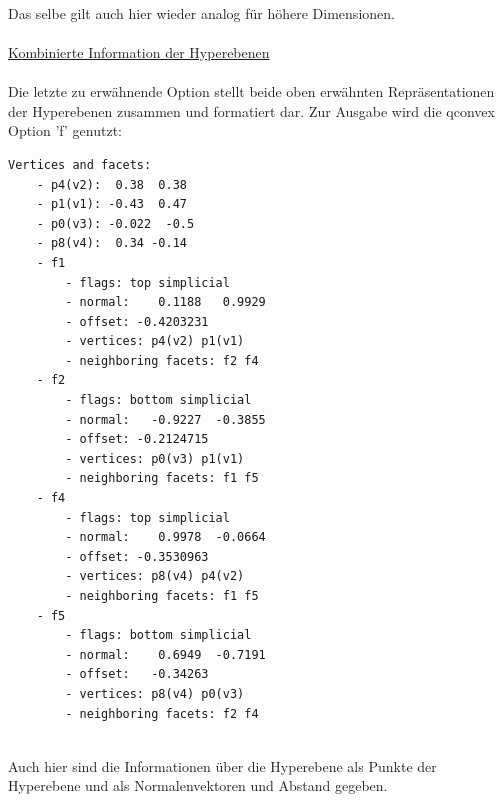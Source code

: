 \documentclass[12pt]{scrartcl}
\begin{document}
\ \\~\\~\\
Das selbe gilt auch hier wieder analog für höhere Dimensionen.\\


\ \\
\underline{Kombinierte Information der Hyperebenen}\\~\\
Die letzte zu erwähnende Option stellt beide oben erwähnten Repräsentationen der Hyperebenen zusammen und formatiert dar. Zur Ausgabe wird die qconvex Option 'f' genutzt:\\

\begin{lstlisting}[style=Terminal, caption={Ausgabe von qconvex mit Option 'f'},captionpos=b]
    Vertices and facets:
    - p4(v2):  0.38  0.38
    - p1(v1): -0.43  0.47
    - p0(v3): -0.022  -0.5
    - p8(v4):  0.34 -0.14
    - f1
        - flags: top simplicial
        - normal:    0.1188   0.9929
        - offset: -0.4203231
        - vertices: p4(v2) p1(v1)
        - neighboring facets: f2 f4
    - f2
        - flags: bottom simplicial
        - normal:   -0.9227  -0.3855
        - offset: -0.2124715
        - vertices: p0(v3) p1(v1)
        - neighboring facets: f1 f5
    - f4
        - flags: top simplicial
        - normal:    0.9978  -0.0664
        - offset: -0.3530963
        - vertices: p8(v4) p4(v2)
        - neighboring facets: f1 f5
    - f5
        - flags: bottom simplicial
        - normal:    0.6949  -0.7191
        - offset:   -0.34263
        - vertices: p8(v4) p0(v3)
        - neighboring facets: f2 f4
\end{lstlisting}
\ \\
Auch hier sind die Informationen über die Hyperebene als Punkte der Hyperebene und als Normalenvektoren und Abstand gegeben.
\end{document}
